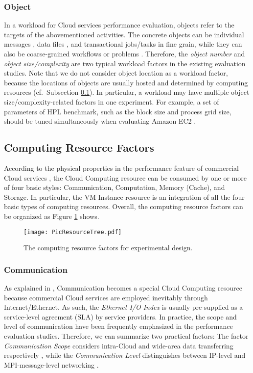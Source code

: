\documentclass[10pt, conference, compsocconf]{IEEEtran}
\begin{document}
\subsubsection{Object}
In a workload for Cloud services performance evaluation, objects refer to the targets of the abovementioned activities. The concrete objects can be individual messages \cite{Hill_Humphrey_2009}, data files \cite{Hill_Li_2010}, and transactional jobs/tasks \cite{Deelman_Singh_2008} in fine grain, while they can also be coarse-grained workflows or problems \cite{Deelman_Singh_2008}. Therefore, the \textit{object number} and \textit{object size/complexity} are two typical workload factors in the existing evaluation studies. Note that we do not consider object location as a workload factor, because the locations of objects are usually hosted and determined by computing resources (cf.~Subsection \ref{III>resources}). In particular, a workload may have multiple object size/complexity-related factors in one experiment. For example, a set of parameters of HPL benchmark, such as the block size and process grid size, should be tuned simultaneously when evaluating Amazon EC2 \cite{Bientinesi_Iakymchuk_2010}.

\subsection{Computing Resource Factors}
\label{III>resources}
According to the physical properties in the performance feature of commercial Cloud services \cite{Li_OBrien_2012a}, the Cloud Computing resource can be consumed by one or more of four basic styles: Communication, Computation, Memory (Cache), and Storage. In particular, the VM Instance resource is an integration of all the four basic types of computing resources. Overall, the computing resource factors can be organized as Figure \ref{fig>PicResourceTree} shows.

\begin{figure}[!t]
\centering
\texttt{[image: PicResourceTree.pdf]}
\caption{The computing resource factors for experimental design.}
\label{fig>PicResourceTree}
\end{figure}

\subsubsection{Communication}
\label{III>Commun}
As explained in \cite{Li_OBrien_2012a}, Communication becomes a special Cloud Computing resource because commercial Cloud services are employed inevitably through Internet/Ethernet. As such, the \textit{Ethernet I/O Index} is usually pre-supplied as a service-level agreement (SLA) by service providers. In practice, the scope and level of communication have been frequently emphasized in the performance evaluation studies. Therefore, we can summarize two practical factors: The factor \textit{Communication Scope} considers intra-Cloud and wide-area data transferring respectively \cite{Li_Yang_2010}, while the \textit{Communication Level} distinguishes between IP-level and MPI-message-level networking \cite{He_Zhou_2010}.
\end{document}
